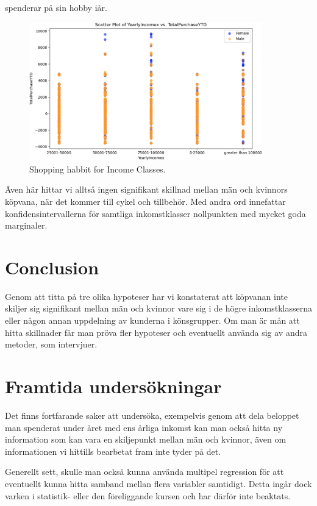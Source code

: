 \documentclass[10pt]{article}
\begin{document}
\noindent spenderar på sin hobby iår.
\begin{figure}[h]
    \centering
    \includegraphics[width=0.9\textwidth]{img_shopping_habbit_for_income_classes.png}
    \caption{Shopping habbit for Income Classes.}
\end{figure}

Även här hittar vi alltså ingen signifikant skillnad mellan män och kvinnors köpvana, när det kommer till cykel och tillbehör. Med andra ord innefattar konfidensintervallerna för samtliga inkomstklasser nollpunkten med mycket goda marginaler.

\section{Conclusion}

Genom att titta på tre olika hypoteser har vi konstaterat att köpvanan inte skiljer sig signifikant mellan män och kvinnor vare sig i de högre inkomstklasserna eller någon annan uppdelning av kunderna i könsgrupper. Om man är mån att hitta skillnader får man pröva fler hypoteser och eventuellt använda sig av andra metoder, som intervjuer.






\section{Framtida undersökningar}

Det finns fortfarande saker att undersöka, exempelvis genom att dela beloppet man spenderat under året med ens årliga inkomst kan man också hitta ny information som kan vara en skiljepunkt mellan män och kvinnor, även om informationen vi hittills bearbetat fram inte tyder på det.

Generellt sett, skulle man också kunna använda multipel regression för att eventuellt kunna hitta samband mellan flera variabler samtidigt. Detta ingår dock varken i statistik- eller den föreliggande kursen och har därför inte beaktats.
\end{document}
